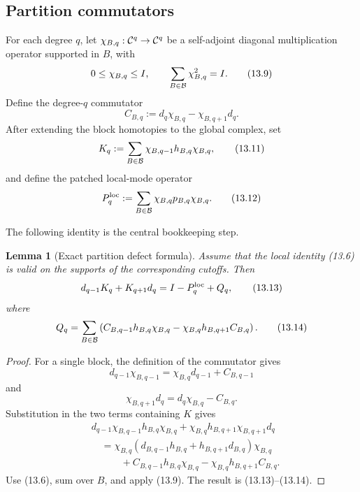 \documentclass[11pt]{article}
\newtheorem{lemma}[theorem]{Lemma}
\theoremstyle{remark}
\begin{document}
\subsection{Partition commutators}

For each degree \(q\), let
\(\chi_{B,q}:{\cal C}^q\to{\cal C}^q\) be a self-adjoint diagonal
multiplication operator supported in \(B\), with
\[
             0\le\chi_{B,q}\le I,\qquad
             \sum_{B\in{\cal B}}\chi_{B,q}^2=I.             \tag{13.9}
\]
Define the degree-\(q\) commutator
\[
 C_{B,q}:=
 d_q\chi_{B,q}-\chi_{B,q+1}d_q.                            \tag{13.10}
\]
After extending the block homotopies to the global complex, set
\[
 K_q:=\sum_{B\in{\cal B}}
       \chi_{B,q-1}h_{B,q}\chi_{B,q},                       \tag{13.11}
\]
and define the patched local-mode operator
\[
 P^{\rm loc}_q:=
 \sum_{B\in{\cal B}}
 \chi_{B,q}p_{B,q}\chi_{B,q}.                              \tag{13.12}
\]

The following identity is the central bookkeeping step.

\begin{lemma}[Exact partition defect formula]
\label{lem:v12v13-partition}
Assume that the local identity (13.6) is valid on the supports of
the corresponding cutoffs.  Then
\[
 d_{q-1}K_q+K_{q+1}d_q
 =I-P^{\rm loc}_q+Q_q,                                     \tag{13.13}
\]
where
\[
 Q_q=
 \sum_{B\in{\cal B}}
 \left(
 C_{B,q-1}h_{B,q}\chi_{B,q}
 -\chi_{B,q}h_{B,q+1}C_{B,q}
 \right).                                                   \tag{13.14}
\]
\end{lemma}

\begin{proof}
For a single block, the definition of the commutator gives
\[
 d_{q-1}\chi_{B,q-1}
 =\chi_{B,q}d_{q-1}+C_{B,q-1}                              \tag{13.15}
\]
and
\[
 \chi_{B,q+1}d_q
 =d_q\chi_{B,q}-C_{B,q}.                                   \tag{13.16}
\]
Substitution in the two terms containing \(K\) gives
\[
\begin{split}
 &d_{q-1}\chi_{B,q-1}h_{B,q}\chi_{B,q}
 +\chi_{B,q}h_{B,q+1}\chi_{B,q+1}d_q\\
 &\quad=
 \chi_{B,q}(d_{B,q-1}h_{B,q}
           +h_{B,q+1}d_{B,q})\chi_{B,q}\\
 &\qquad\quad+
 C_{B,q-1}h_{B,q}\chi_{B,q}
 -\chi_{B,q}h_{B,q+1}C_{B,q}.
\end{split}                                                 \tag{13.17}
\]
Use (13.6), sum over \(B\), and apply (13.9).  The result is
(13.13)--(13.14).
\end{proof}
\end{document}
